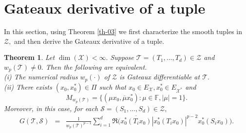\documentclass{amsart}
\newtheorem{theorem}{Theorem}[section]
\theoremstyle{definition}
\theoremstyle{remark}
\numberwithin{equation}{section}
\begin{document}
\section{Gateaux derivative of a tuple}
In this section, using Theorem \ref{th-03} we first characterize the smooth tuples in $\mathcal{Z},$ and then derive the Gateaux derivative of a tuple.
\begin{theorem}\label{th-04}
		Let $\dim(\mathcal{X})<\infty.$  Suppose $\mathcal{T}=(T_1,\ldots,T_d)\in \mathcal{Z}$ and $w_p(\mathcal{T})\neq 0.$ Then the following are equivalent.\\
		\rm(i) The numerical radius $w_p(\cdot)$ of $\mathcal{Z}$ is Gateaux differentiable at $\mathcal{T}.$\\
		\rm(ii) There exists $(x_0,x_0^*)\in \Pi$ such that $x_0\in E_{\mathcal{X}}, x_0^*\in E_{\mathcal{X}^*}$ and $$M_{w_p(\mathcal{T})}=\{(\mu x_0, \overline{\mu} x_0^*):\mu\in \mathbb{F},|\mu|=1\}.$$
		Moreover, in this case, for each $\mathcal{S}=(S_1,\ldots,S_d) \in \mathcal{Z},$
	\begin{eqnarray*}
		G(\mathcal{T},\mathcal{S})
		&=&\frac{1}{w_p(\mathcal{T})^{p-1}}\sum_{i=1}^d\Re\bigg(\overline{x_0^*(T_ix_0)}|x_0^*(T_ix_0)|^{p-2}x_0^*(S_ix_0) \bigg).
	\end{eqnarray*}
\end{theorem}
\end{document}
